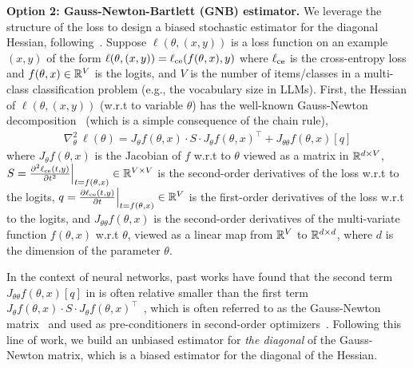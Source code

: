 \newcommand{\ce}{\ell_{\textup{ce}}}
\textbf{Option 2: Gauss-Newton-Bartlett (GNB) estimator.} We leverage the structure of the loss to design a biased stochastic estimator for the diagonal Hessian, following~\citet{schraudolph2002fast,martens2020new,wei2020implicit}. Suppose $\ell(\theta, (x,y))$ is a loss function on an example $(x,y)$ of the form $\ell(\theta, (x,y)) = \ce(f(\theta,x), y)$ where $\ce$ is the cross-entropy loss and $f(\theta, x)\in \mathbb{R}^{V}$ is the logits, and $V$ is the number of items/classes in a multi-class classification problem (e.g., the vocabulary size in LLMs). First, the Hessian of $\ell(\theta, (x,y))$ (w.r.t to variable $\theta$) has the well-known Gauss-Newton decomposition~\citep{ortega2000iterative,schraudolph2002fast} (which is a simple consequence of the chain rule), 
\begin{align}
    \nabla_\theta^2~\ell(\theta) = J_\theta f(\theta,x) \cdot S \cdot  J_\theta f(\theta, x)^\top + J_{\theta\theta}f(\theta, x)[q] \label{eqn:GN}
\end{align}
where $J_\theta f(\theta,x)$ is the Jacobian of $f$ w.r.t to $\theta$ viewed as a matrix in $\mathbb{R}^{d\times V}$,  $S = \frac{\partial^2 \ce(t,y)}{\partial t^2}\Big\vert_{t=f(\theta, x)}\in \R^{V\times V}$ is the second-order derivatives of the loss w.r.t to the logits, $q = \frac{\partial \ce(t,y)}{\partial t}\Big\vert_{t=f(\theta, x)} \in \R^V$ is the first-order derivatives of the loss w.r.t to the logits, and $J_{\theta\theta}f(\theta,x)$ is the second-order derivatives of the multi-variate function $f(\theta, x)$ w.r.t $\theta$, viewed as a linear map from $\mathbb{R}^{V}$ to $\mathbb{R}^{d \times d}$, where $d$ is the dimension of the parameter $\theta$.

In the context of neural networks, past works have found that the second term $J_{\theta\theta}f(\theta, x)[q]$ in  is often relative smaller than the first term $J_\theta f(\theta,x) \cdot S \cdot  J_\theta f(\theta, x)^\top$~\citep{sankar2021deeper}, which is often referred to as the Gauss-Newton matrix~\citep{dennis1996numerical,ortega2000iterative,schraudolph2002fast,chen2011hessian} and used as pre-conditioners in second-order optimizers~\citep{botev2017practical,martens2020new,gargiani2020promise}. 
Following this line of work, we build an unbiased estimator for \textit{the diagonal} of the Gauss-Newton matrix, which is a biased estimator for the diagonal of the Hessian. 

